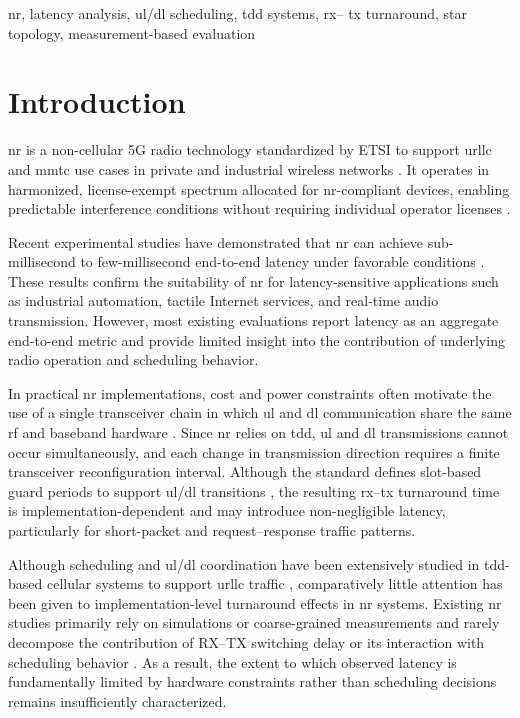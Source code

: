 \documentclass[conference]{IEEEtran}
\begin{document}
\begin{IEEEkeywords}
\gls{nr}, latency analysis, \gls{ul}/\gls{dl} scheduling, \gls{tdd} systems,  \gls{rx}-- \gls{tx} turnaround, star topology, measurement-based evaluation
\end{IEEEkeywords}

\glsresetall

\section{Introduction}
\gls{nr} is a non-cellular 5G radio technology standardized by ETSI to support \gls{urllc} and \gls{mmtc} use cases in private and industrial wireless networks \cite{TS1036361,kovalchukovDECT2020NewRadio2022a,holmaDECT2020NextStep2021}. 
It operates in harmonized, license-exempt spectrum allocated for \gls{nr}-compliant devices, enabling predictable interference conditions without requiring individual operator licenses \cite{samuylovEmpoweringNearURLLCIoT2025,durreDECT2020NRProfessional2024a}.

Recent experimental studies have demonstrated that \gls{nr} can achieve sub-millisecond to few-millisecond end-to-end latency under favorable conditions \cite{mudriievskyiCHEAP5GDECT2024,maliatsosEvaluationIMT2020Candidate2022,durreDECT2020NRProfessional2024a}. These results confirm the suitability of \gls{nr} for latency-sensitive applications such as industrial automation, tactile Internet services, and real-time audio transmission. However, most existing evaluations report latency as an aggregate end-to-end metric and provide limited insight into the contribution of underlying radio operation and scheduling behavior.

In practical \gls{nr} implementations, cost and power constraints often motivate the use of a single transceiver chain in which \gls{ul} and \gls{dl} communication share the same \gls{rf} and baseband hardware \cite{TS1036362}. Since \gls{nr} relies on \gls{tdd}, \gls{ul} and \gls{dl} transmissions cannot occur simultaneously, and each change in transmission direction requires a finite transceiver reconfiguration interval. Although the standard defines slot-based guard periods to support \gls{ul}/\gls{dl} transitions \cite{TS1036362}, the resulting \gls{rx}--\gls{tx} turnaround time is implementation-dependent and may introduce non-negligible latency, particularly for short-packet and request--response traffic patterns.

Although scheduling and \gls{ul}/\gls{dl} coordination have been extensively studied in \gls{tdd}-based cellular systems to support \gls{urllc} traffic \cite{esswieQuasiDynamicFrameCoordination2019}, comparatively little attention has been given to implementation-level turnaround effects in \gls{nr} systems. Existing \gls{nr} studies primarily rely on simulations or coarse-grained measurements and rarely decompose the contribution of RX--TX switching delay or its interaction with scheduling behavior \cite{glazkovImprovingNearURLLCServices2025,andreevDECT2020NRMesh2023}. As a result, the extent to which observed latency is fundamentally limited by hardware constraints rather than scheduling decisions remains insufficiently characterized.
\end{document}
